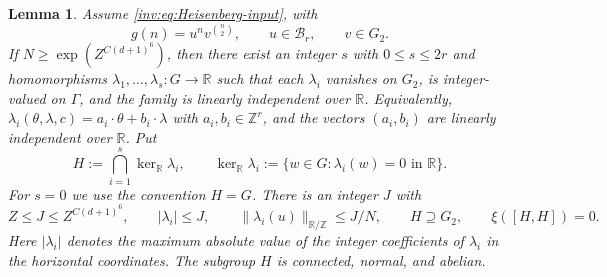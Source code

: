 \documentclass[twoside]{aomart}
\theoremstyle{paperplain}
\newtheorem{lemma}[theorem]{Lemma}
\theoremstyle{paperdefinition}
\numberwithin{equation}{section}
\begin{document}
\begin{lemma}
\label{inv:dense-constraints}
Assume \eqref{inv:eq:Heisenberg-input}, with
\[
 g(n)=u^nv^{\binom n2},\qquad u\in\mathcal B_r,\qquad v\in G_2.
\]
If $N\ge\exp(Z^{C(d+1)^6})$, then there exist an integer $s$ with
$0\le s\le2r$ and homomorphisms
$\lambda_1,\ldots,\lambda_s:G\to\mathbb R$ such that each $\lambda_i$
vanishes on $G_2$, is integer-valued on $\Gamma$, and the family is
linearly independent over $\mathbb R$. Equivalently,
$\lambda_i(\theta,\lambda,c)=a_i\cdot\theta+b_i\cdot\lambda$ with
$a_i,b_i\in\mathbb Z^r$, and the vectors $(a_i,b_i)$ are linearly
independent over $\mathbb R$. Put
\[
 H:=\bigcap_{i=1}^{s}\ker_{\mathbb R}\lambda_i,\qquad
 \ker_{\mathbb R}\lambda_i:=\{w\in G:\lambda_i(w)=0\text{ in }\mathbb R\}.
\]
For $s=0$ we use the convention $H=G$.
There is an integer $J$ with
\begin{equation}
 Z\le J\le Z^{C(d+1)^6},\qquad
 |\lambda_i|\le J,\qquad
 \|\lambda_i(u)\|_{\mathbb R/\mathbb Z}\le J/N,\qquad
 H\supseteq G_2,\qquad
 \xi([H,H])=0 .
\label{inv:dense-constraints-output}
\end{equation}
Here $|\lambda_i|$ denotes the maximum absolute value of the integer
coefficients of $\lambda_i$ in the horizontal coordinates. The subgroup
$H$ is connected, normal, and abelian.
\end{lemma}
\end{document}
